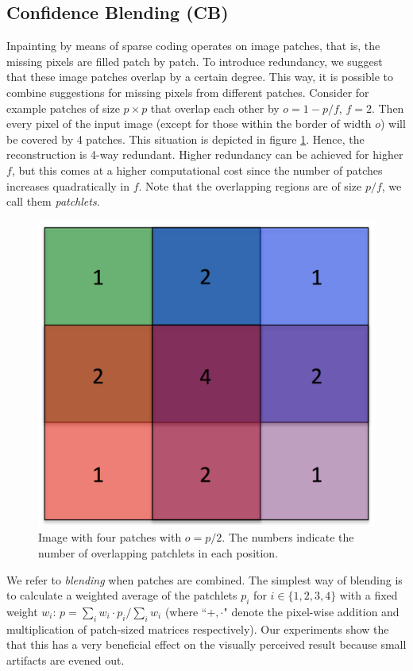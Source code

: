 \subsection{Confidence Blending (CB)}
Inpainting by means of sparse coding operates on image patches, that is, the missing pixels are filled patch by patch. To introduce redundancy, we suggest that these image patches overlap by a certain degree. This way, it is possible to combine suggestions for missing pixels from different patches. Consider for example patches of size $p\times p$ that overlap each other by $o=1-p/f$, $f=2$. Then every pixel of the input image (except for those within the border of width $o$) will be covered by 4 patches. This situation is depicted in figure \ref{fig:overlapping_patches}. Hence, the reconstruction is 4-way redundant. Higher redundancy can be achieved for higher $f$, but this comes at a higher computational cost since the number of patches increases quadratically in $f$. Note that the overlapping regions are of size $p/f$, we call them \textit{patchlets}.

\begin{figure}[b]
   \centering
	\includegraphics[width=.5\columnwidth]{graphics/overlapping_patches.png}%
	\caption{Image with four patches with $o=p/2$. The numbers indicate the number of overlapping patchlets in each position.
	\label{fig:overlapping_patches}
	}
\end{figure}

We refer to \textit{blending} when patches are combined. The simplest way of blending is to calculate a weighted average of the patchlets $p_i$ for $i\in\{1,2,3,4\}$ with a fixed weight $w_i$: $p=\sum_i w_i \cdot p_i/\sum_i w_i$ (where ``$+,\cdot$" denote the pixel-wise addition and multiplication of patch-sized matrices respectively). Our experiments show the that this has a very beneficial effect on the visually perceived result because small artifacts are evened out.

